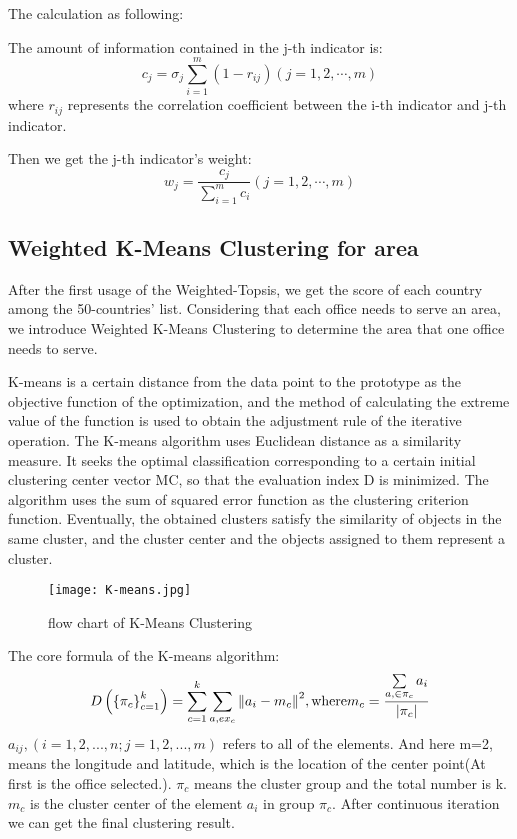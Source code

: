 \documentclass[12pt]{article}  %
\begin{document}
\begin{itemize}
	The calculation as following:
	
	The amount of information contained in the j-th indicator is:
	\begin{equation}
		{c_j} = {\sigma _j}\sum\limits_{i = 1}^m {(1 - {r_{ij}})(j = 1,2, \cdots ,m)} 
	\end{equation}
	where ${r_{ij}}$ represents the correlation coefficient between the i-th indicator and j-th indicator.
	
	Then we get the j-th indicator's weight:
	\begin{equation}
		{w_j} = \frac{{{c_j}}}{{\sum\limits_{i = 1}^m {{c_i}} }}(j = 1,2, \cdots ,m)
	\end{equation}
\end{itemize}

\subsection{Weighted K-Means Clustering for area}
After the first usage of the Weighted-Topsis, we get the score of each country among the 50-countries' list. Considering that each office needs to serve an area, we introduce Weighted K-Means Clustering to determine the area that one office needs to serve.

K-means is a certain distance from the data point to the prototype as the objective function of the optimization, and the method of calculating the extreme value of the function is used to obtain the adjustment rule of the iterative operation. The K-means algorithm uses Euclidean distance as a similarity measure. It seeks the optimal classification corresponding to a certain initial clustering center vector MC, so that the evaluation index D is minimized. The algorithm uses the sum of squared error function as the clustering criterion function. Eventually, the obtained clusters satisfy the similarity of objects in the same cluster, and the cluster center and the objects assigned to them represent a cluster.

\begin{figure}[H]
	\centering
	\texttt{[image: K-means.jpg]}
	\caption{flow chart of K-Means Clustering}\label{fig:K-means}
\end{figure}

The core formula of the K-means algorithm:
\begin{equation}
	D\left( {\left\{ {{\pi _c}} \right\}_{c = 1}^k} \right) = \sum\limits_{c = 1}^k {\sum\limits_{a,e{x_c}} {{{\left\| {{a_i} - {m_c}} \right\|}^2}} } ,{\rm{ where }}{m_c} = \frac{{\sum\limits_{a, \in {\pi _c}} {{a_i}} }}{{\left| {{\pi _c}} \right|}}
\end{equation}
${a_{ij}},\left( {i = 1,2,...,n;j = 1,2,...,m} \right)$ refers to all of the elements. And here m=2, means the longitude and latitude, which is the location of the center point(At first is the office selected.). ${\pi _c}$ means the cluster group and the total number is k. ${m_c}$ is the cluster center of the element ${a_i}$ in group ${\pi _c}$. After continuous iteration we can get the final clustering result.
\end{document}
